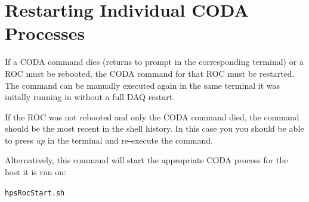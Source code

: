 \documentclass[12pt]{article}
\begin{document}
\section{Restarting Individual CODA Processes}\label{sec:codacommands}
If a CODA command dies (returns to prompt in the corresponding terminal) or a ROC must be rebooted, the CODA command for that ROC must be restarted.  The command can be manually executed again in the same terminal it was initally running in without a full DAQ restart.

If the ROC was not rebooted and only the CODA command died, the command should be the most recent in the shell history.  In this case you you should be able to press {\em up} in the terminal and re-execute the command.

Alternatively, this command will start the appropriate CODA process for the host it is run on:

\centerline{\texttt{hpsRocStart.sh}}

\end{document}
